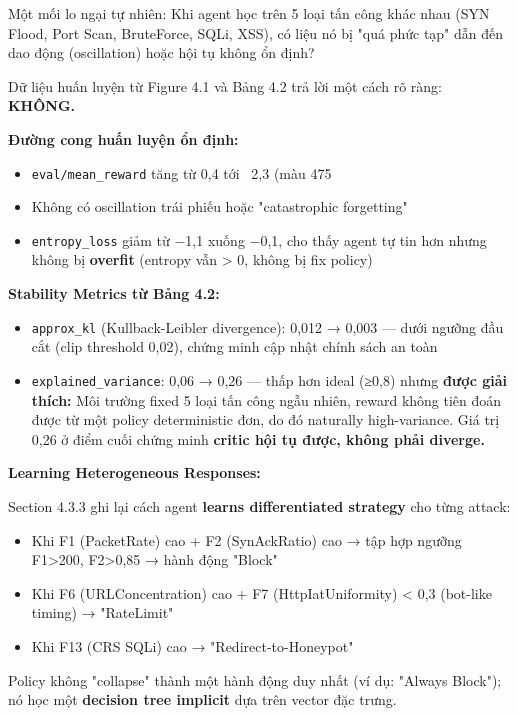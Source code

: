 \documentclass[12pt,a4paper,twoside]{report}
\begin{document}
{{{{{{{{{{Một mối lo ngại tự nhiên: Khi agent học trên 5 loại tấn công khác nhau (SYN Flood, Port Scan, BruteForce, SQLi, XSS), có liệu nó bị "quá phức tạp" dẫn đến dao động (oscillation) hoặc hội tụ không ổn định?

Dữ liệu huấn luyện từ Figure 4.1 và Bảng 4.2 trả lời một cách rõ ràng: \textbf{KHÔNG.}

\textbf{Đường cong huấn luyện ổn định:}
\begin{itemize}
\item \texttt{eval/mean_reward} tăng từ 0,4 tới ~2,3 (màu 475%
\item Không có oscillation trái phiếu hoặc "catastrophic forgetting"
\item \texttt{entropy_loss} giảm từ −1,1 xuống −0,1, cho thấy agent tự tin hơn nhưng không bị \textbf{overfit} (entropy vẫn > 0, không bị fix policy)
\end{itemize}

\textbf{Stability Metrics từ Bảng 4.2:}
\begin{itemize}
\item \texttt{approx_kl} (Kullback-Leibler divergence): 0,012 → 0,003 — dưới ngưỡng đầu cắt (clip threshold 0,02), chứng minh cập nhật chính sách an toàn
\item \texttt{explained_variance}: 0,06 → 0,26 — thấp hơn ideal (≥0,8) nhưng \textbf{được giải thích:} Môi trường fixed 5 loại tấn công ngẫu nhiên, reward không tiên đoán được từ một policy deterministic đơn, do đó naturally high-variance. Giá trị 0,26 ở điểm cuối chứng minh \textbf{critic hội tụ được, không phải diverge.}
\end{itemize}

\textbf{Learning Heterogeneous Responses:}

Section 4.3.3 ghi lại cách agent \textbf{learns differentiated strategy} cho từng attack:
\begin{itemize}
\item Khi F1 (PacketRate) cao + F2 (SynAckRatio) cao → tập hợp ngưỡng F1>200, F2>0,85 → hành động "Block"
\item Khi F6 (URLConcentration) cao + F7 (HttpIatUniformity) < 0,3 (bot-like timing) → "RateLimit"
\item Khi F13 (CRS SQLi) cao → "Redirect-to-Honeypot"
\end{itemize}

Policy không "collapse" thành một hành động duy nhất (ví dụ: "Always Block"); nó học một \textbf{decision tree implicit} dựa trên vector đặc trưng.

}}}}}}}}}}
\end{document}

